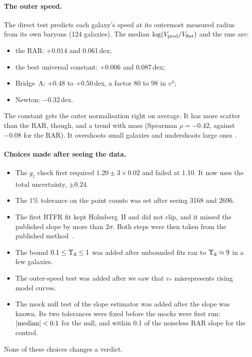 \paragraph{The outer speed.} The direct test predicts each galaxy's speed at its outermost measured radius from its own baryons (124
galaxies). The median $\log(V_{\rm pred}/V_{\rm flat})$ and the rms are:
\begin{itemize}[nosep]
\item the RAR: $+0.014$ and 0.061\,dex;
\item the best universal constant: $+0.006$ and 0.087\,dex;
\item Bridge~A: $+0.48$ to $+0.50$\,dex, a factor 80 to 98 in $v^4$;
\item Newton: $-0.32$\,dex.
\end{itemize}
The constant gets the outer normalisation right on average. It has more scatter than the RAR, though, and a trend with mass (Spearman
$\rho=-0.42$, against $-0.08$ for the RAR). It overshoots small galaxies and undershoots large ones .

\paragraph{Choices made after seeing the data.}
\begin{itemize}[nosep]
\item The $g_\dagger$ check first required $1.20\pm3\times0.02$ and failed at 1.10. It now uses the total uncertainty, $\pm0.24$.
\item The 1\% tolerance on the point counts was set after seeing 3168 and 2696.
\item The first BTFR fit kept Holmberg~II and did not clip, and it missed the published slope by more than $2\sigma$. Both steps were then
taken from the published method~\cite{lelli2016a,cappellari2013}.
\item The bound $0.1\le\Upsilon_{\rm d}\le1$ was added after unbounded fits ran to $\Upsilon_{\rm d}\approx9$ in a few galaxies.
\item The outer-speed test was added after we saw that $v_*$ misrepresents rising model curves.
\item The mock null test of the slope estimator was added after the slope was known. Its two tolerances were fixed before the mocks were
first run: $|{\rm median}|<0.1$ for the null, and within 0.1 of the noiseless RAR slope for the control.
\end{itemize}
None of these choices changes a verdict.

